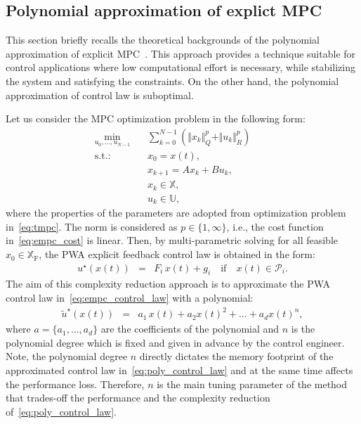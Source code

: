 \documentclass[letterpaper, 10 pt, conference]{ieeeconf}
\newcommand{\polydegree}{n}
\begin{document}
\subsection{Polynomial approximation of explict MPC}
\label{sec:polynomial}
This section briefly recalls the theoretical backgrounds of the polynomial approximation of explicit MPC~\cite{kvasnica_polynomial}. This approach provides a technique suitable for control applications where low computational effort is necessary, while stabilizing the system and satisfying the constraints. On the other hand, the polynomial approximation of control law is suboptimal. 

Let us consider the MPC optimization problem in the following form:
\begin{subequations}
	\label{eq:empc}
	\begin{eqnarray}
		\label{eq:empc_cost}
		\min_{u_{0},\ldots,u_{N-1}} \!\!\!\!\!\!\!\!\!\!\! &\,& \sum_{k=0}^{N-1} \left( \Vert x_{k} \Vert_{Q}^{p} + \Vert u_{k} \Vert_{R}^{p} \right) \qquad \\
		\label{eq:empc_rpi}
		\mathrm{s.t.\!:} &\,& x_0 = x(t), \\
		\label{eq:empc_model}
		&\,&  x_{k+1} = A x_{k} + B u_{k} , \\
		\label{eq:empc_constraints_state}
		&\,& x_{k} \in \mathbb{X} , \\
		\label{eq:empc_constraints_input}
		&\,& u_{k} \in \mathbb{U},
	\end{eqnarray}
\end{subequations}
where the properties of the parameters are adopted from optimization problem in~\eqref{eq:tmpc}. The norm is considered as $p \in \{1,\infty \}$, i.e., the cost function in~\eqref{eq:empc_cost} is linear. Then, by multi-parametric solving for all feasible $x_0 \in \mathbb{X}_{\mathrm{F}}$, the PWA explicit feedback control law is obtained in the form:
\begin{eqnarray}
	\label{eq:empc_control_law}
	u^{\star}(x(t)) \!\!\!\!&=&\!\!\!\! F_{i} \, x(t) + g_{i} \quad \text{if} \quad x(t) \in \mathcal{P}_{i}.
\end{eqnarray}
The aim of this complexity reduction approach is to approximate the PWA control law in~\eqref{eq:empc_control_law} with a polynomial:
\begin{eqnarray}
	\label{eq:poly_control_law}
	\widetilde{u}^{\star}(x(t)) \!\!\!\!&=&\!\!\!\! a_{1} \, x(t) + a_{2} x(t)^2 + \dots + a_{d} x(t)^\polydegree,
\end{eqnarray}
where $a =\{a_{1}, \dots, a_{d}\}$ are the coefficients of the polynomial and $\polydegree$ is the polynomial degree which is fixed and given in advance by the control engineer. Note, the polynomial degree $\polydegree$ directly dictates the memory footprint of the approximated control law in~\eqref{eq:poly_control_law} and at the same time affects the performance loss. Therefore, $\polydegree$ is the main tuning parameter of the method that trades-off the performance and the complexity reduction of~\eqref{eq:poly_control_law}.
\end{document}

